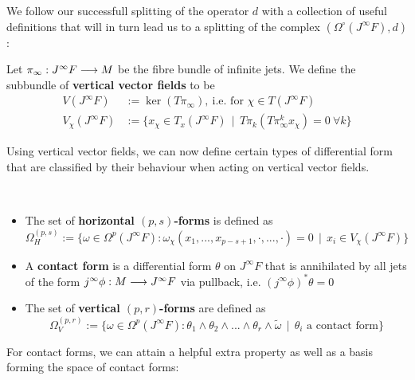 We follow our successfull splitting of the operator $d$ with a collection of useful definitions that will in turn lead us to a splitting of the complex $(\Omega^\circ(J^\infty F), d)$:

\begin{definition}
Let $\pi_\infty: J^\infty F \longrightarrow M$ be the fibre bundle of infinite jets. We define the subbundle of \textbf{vertical vector fields} to be
\begin{align*}
  V(J^\infty F) &:= \ker (T\pi_\infty), \ \text{i.e. for } \chi\in T(J^\infty F)\\
  V_\chi(J^\infty F) &:= \{ x_\chi \in T_x(J^\infty F) \ \ | \ \ T\pi_k(T\pi_\infty^k x_\chi) = 0 \ \forall k \}
\end{align*}
\end{definition}

Using vertical vector fields, we can now define certain types of differential form that are classified by their behaviour when acting on vertical vector fields.

\begin{definition}~
\begin{itemize}
  \item The set of \textbf{horizontal $(p,s)$-forms} is defined as
  $$ \Omega^{(p,s)}_H := \{ \omega \in \Omega^p(J^\infty F) : \omega_\chi (x_1, ..., x_{p-s+1}, \cdot, ..., \cdot) = 0 \ \ |\ \  x_i \in V_\chi(J^\infty F) \} $$

  \item A \textbf{contact form} is a differential form $\theta$ on $J^\infty F$ that is annihilated by all jets of the form $j^\infty \phi : M \lra J^\infty F$ via pullback, i.e. $(j^\infty \phi)^* \theta = 0$

  \item The set of \textbf{vertical $(p,r)$-forms} are defined as
  $$ \Omega^{(p,r)}_V := \{ \omega \in \Omega^p(J^\infty F) : \theta_1 \wedge \theta_2 \wedge ... \wedge \theta_r \wedge \widetilde \omega \ \ |\ \  \theta_i \text{ a  contact form} \} $$
\end{itemize}
\end{definition}

For contact forms, we can attain a helpful extra property as well as a basis forming the space of contact forms:

